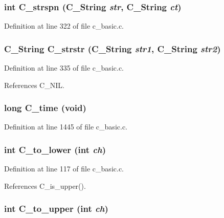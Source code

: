 \subsubsection{\setlength{\rightskip}{0pt plus 5cm}int C\_\-strspn (\bf{C\_\-String} {\em str}, \bf{C\_\-String} {\em ct})}\label{c__basic_8c_c43918876a1062adab478a9e2aa5107b}




Definition at line 322 of file c\_\-basic.c.
\subsubsection{\setlength{\rightskip}{0pt plus 5cm}\bf{C\_\-String} C\_\-strstr (\bf{C\_\-String} {\em str1}, \bf{C\_\-String} {\em str2})}\label{c__basic_8c_5075f80a4e19dfbb232d65d3ac6c15fb}




Definition at line 335 of file c\_\-basic.c.

References C\_\-NIL.
\subsubsection{\setlength{\rightskip}{0pt plus 5cm}long C\_\-time (void)}\label{c__basic_8c_23d871b92e007ec3a9e9937cb26b9b17}




Definition at line 1445 of file c\_\-basic.c.
\subsubsection{\setlength{\rightskip}{0pt plus 5cm}int C\_\-to\_\-lower (int {\em ch})}\label{c__basic_8c_5f5fad17f5660e69be8fe7c41bd2de1b}




Definition at line 117 of file c\_\-basic.c.

References C\_\-is\_\-upper().
\subsubsection{\setlength{\rightskip}{0pt plus 5cm}int C\_\-to\_\-upper (int {\em ch})}\label{c__basic_8c_1b90db0d0093f3fc6828f7609d6e9ff8}




